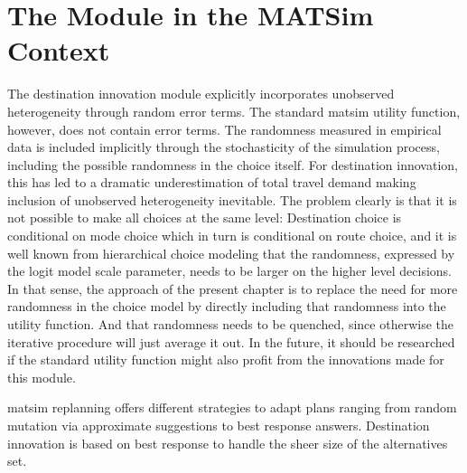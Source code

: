 \section{The Module in the MATSim Context}
The destination innovation module explicitly incorporates unobserved heterogeneity through random error terms. 
The standard \gls{matsim} utility function, however, does not contain error terms. 
The randomness measured in empirical data is included implicitly through the stochasticity of the simulation process, including the possible randomness in the choice itself. 
For destination innovation, this has led to a dramatic underestimation of total travel demand making inclusion of unobserved heterogeneity inevitable.
%
The problem clearly is that it is not possible to make all choices at the same level: Destination choice is conditional on mode choice which in turn is conditional on route choice, and it is well known from hierarchical choice modeling that the randomness, expressed by the logit model scale parameter, needs to be larger on the higher level decisions.  In that sense, the approach of the present chapter is to replace the need for more randomness in the choice model by directly including that randomness into the utility function. And that randomness needs to be quenched, since otherwise the iterative procedure will just average it out.
%
In the future, it should be researched if the standard utility function might also profit from the innovations made for this module.

\gls{matsim} replanning offers different strategies to adapt plans ranging from random mutation via approximate suggestions to best response answers. 
Destination innovation is based on best response to handle the sheer size of the alternatives set. 

